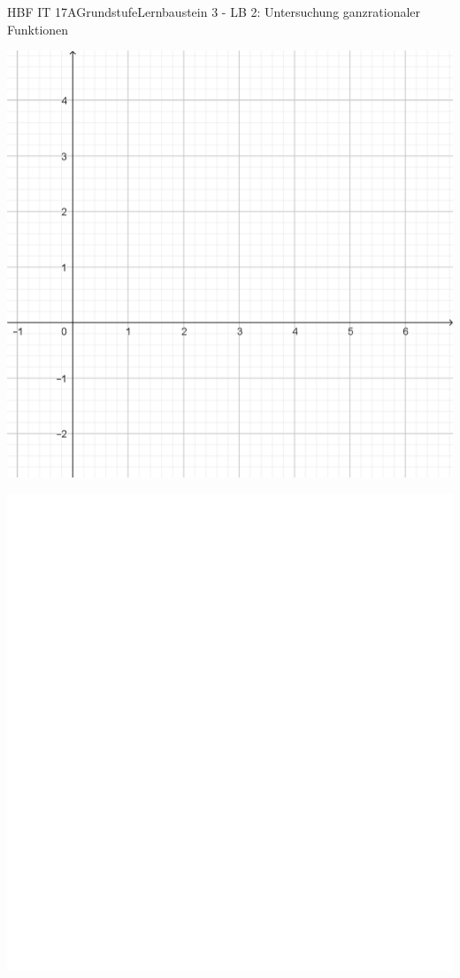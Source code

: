 \documentclass[oneside,openany,headings=optiontotoc,11pt,numbers=noenddot]{scrreprt}
\begin{document}
\begin{worksheet}{HBF IT 17A}{Grundstufe}{Lernbaustein 3 - LB 2: Untersuchung ganzrationaler Funktionen}
\begin{framed}
			\includegraphics[scale=0.5]{Bilder/Koord_g.png}
		\end{framed}
		\begin{framed}
			\includegraphics[scale=0.5]{../empty.jpg}

\end{framed}
\end{worksheet}
\end{document}
